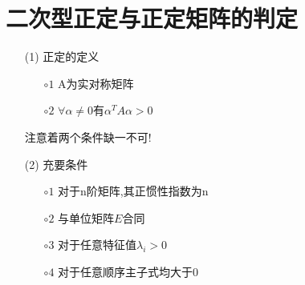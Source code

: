 \documentclass[12pt, a4paper, oneside, UTF8]{ctexbook}
\begin{document}
\section{二次型正定与正定矩阵的判定}
\begin{definition}[方法]
    \begin{enumerate}
        \item [(1)]正定的定义 
            \begin{enumerate}
                \item [$\circ 1$] A为实对称矩阵 
                \item [$\circ 2$] $\forall\alpha\neq 0$有$\alpha^TA\alpha>0$
            \end{enumerate}
            注意着两个条件缺一不可!
        \item [(2)] 充要条件
            \begin{enumerate}
                \item [$\circ 1$] 对于n阶矩阵,其正惯性指数为n 
                \item [$\circ 2$] 与单位矩阵$E$合同 
                \item [$\circ 3$] 对于任意特征值$\lambda_i>0$
                \item [$\circ 4$] 对于任意顺序主子式均大于0
            \end{enumerate}
    \end{enumerate}
\end{definition}
\end{document}
